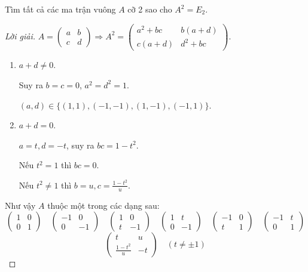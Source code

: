 \documentclass[class=linearalgebra,crop=false]{standalone}
\begin{document}
\begin{exercise}
    Tìm tất cả các ma trận vuông $A$ cỡ 2 sao cho $A^{2} = E_{2}$.
\end{exercise}

\begin{proof}[Lời giải]
    $A = \begin{pmatrix}a & b \\ c & d\end{pmatrix}\Rightarrow A^{2} = \begin{pmatrix}a^{2}+bc & b(a+d) \\ c(a+d) & d^{2}+bc\end{pmatrix}$.
    \begin{enumerate}[label = Trường hợp \arabic*:,itemindent=2cm]
        \item $a + d\ne 0$.
              \par Suy ra $b = c = 0$, $a^{2} = d^{2} = 1$.
              \par $(a,d)\in\{  (1,1), (-1,-1), (1,-1), (-1,1) \}$.
        \item $a + d = 0$.
              \par $a = t, d = -t$, suy ra $bc = 1 - t^{2}$.
              \par Nếu $t^{2} = 1$ thì $bc = 0$.
              \par Nếu $t^{2} \ne 1$ thì $b = u, c = \frac{1-t^{2}}{u}$.
    \end{enumerate}
    \par Như vậy $A$ thuộc một trong các dạng sau:
    \[
        \begin{pmatrix}
            1 & 0 \\
            0 & 1
        \end{pmatrix}
        \quad
        \begin{pmatrix}
            -1 & 0  \\
            0  & -1
        \end{pmatrix}
        \quad
        \begin{pmatrix}
            1 & 0  \\
            t & -1
        \end{pmatrix}
        \quad
        \begin{pmatrix}
            1 & t  \\
            0 & -1
        \end{pmatrix}
        \quad
        \begin{pmatrix}
            -1 & 0 \\
            t  & 1
        \end{pmatrix}
        \quad
        \begin{pmatrix}
            -1 & t \\
            0  & 1
        \end{pmatrix}
    \]
    \[
        \begin{pmatrix}
            t                 & u  \\
            \frac{1-t^{2}}{u} & -t
        \end{pmatrix} \quad (t\ne\pm{1})
    \]
\end{proof}
\end{document}
